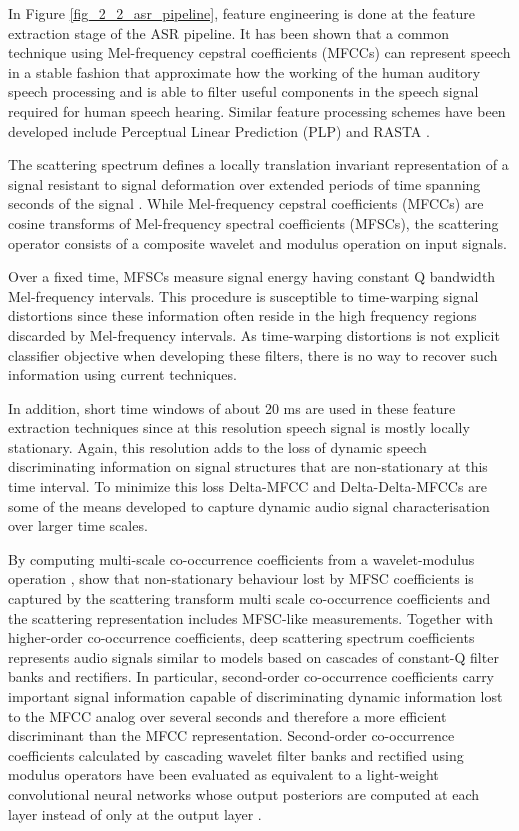 In Figure \ref{fig_2_2_asr_pipeline}, feature engineering is done at the feature extraction stage of the ASR pipeline. It has been shown that a common technique using Mel-frequency cepstral coefficients (MFCCs) \citep{davis1980comparison} can represent speech in a stable fashion that approximate how the working of the human auditory speech processing and is able to filter useful components in the speech signal required for human speech hearing. Similar feature processing schemes have been developed include Perceptual Linear Prediction (PLP) \citep{hermansky1990perceptual} and RASTA \citep{hermansky1994rasta}. 

The scattering spectrum defines a locally translation invariant representation of a signal resistant to signal deformation over extended periods of time spanning seconds of the signal \citep{anden2014deep}. While Mel-frequency cepstral coefficients (MFCCs) are cosine transforms of Mel-frequency spectral coefficients (MFSCs), the scattering operator consists of a composite wavelet and modulus operation on input signals. 

Over a fixed time, MFSCs measure signal energy having constant Q bandwidth Mel-frequency intervals.  This procedure is susceptible to time-warping signal distortions since these information often reside in the high frequency regions discarded by Mel-frequency intervals.  As time-warping distortions is not explicit classifier objective when developing these filters, there is no way to recover such information using current techniques. 

In addition, short time windows of about 20 ms are used in these feature extraction techniques since at this resolution speech signal is mostly locally stationary.  Again, this resolution adds to the loss of dynamic speech discriminating information on signal structures that are non-stationary at this time interval. To minimize this loss Delta-MFCC and Delta-Delta-MFCCs \citep{furui1986speaker} are some of the means developed to capture dynamic audio signal characterisation over  larger time scales.

By computing multi-scale co-occurrence coefficients from a wavelet-modulus operation \cite{anden2011multiscale}, show that non-stationary behaviour lost by MFSC coefficients is captured by the scattering transform multi scale co-occurrence coefficients and the scattering representation includes MFSC-like measurements.  Together with higher-order co-occurrence coefficients, deep scattering spectrum coefficients represents audio signals similar to  models based on cascades of constant-Q filter banks and rectifiers.  In particular, second-order co-occurrence coefficients carry important  signal information capable of discriminating dynamic information lost to the MFCC analog over several seconds and therefore a more efficient discriminant than the MFCC representation. Second-order co-occurrence coefficients calculated by cascading wavelet filter banks and rectified using modulus operators have been evaluated as equivalent to a light-weight convolutional neural networks whose output posteriors are computed at each layer instead of only at the output layer \cite{mallat2016understanding}.

